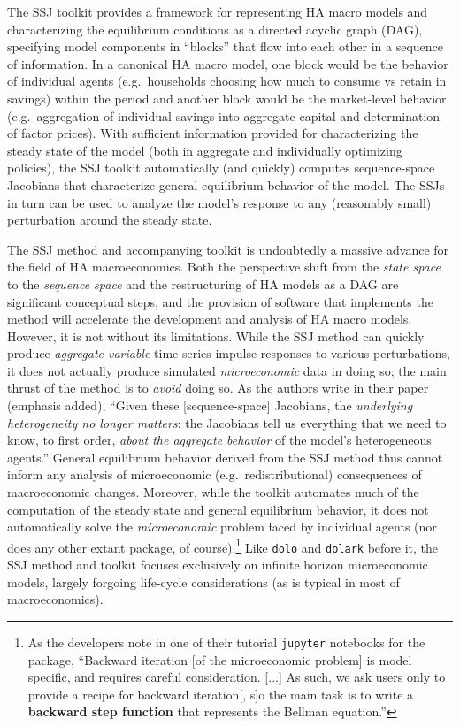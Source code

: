 \documentclass[12pt,pdftex,letterpaper]{article}
\begin{document}
The SSJ toolkit provides a framework for representing HA macro models and characterizing the equilibrium conditions as a directed acyclic graph (DAG), specifying model components in ``blocks'' that flow into each other in a sequence of information. In a canonical HA macro model, one block would be the behavior of individual agents (e.g.\ households choosing how much to consume vs retain in savings) within the period and another block would be the market-level behavior (e.g.\ aggregation of individual savings into aggregate capital and determination of factor prices). With sufficient information provided for characterizing the steady state of the model (both in aggregate and individually optimizing policies), the SSJ toolkit automatically (and quickly) computes sequence-space Jacobians that characterize general equilibrium behavior of the model. The SSJs in turn can be used to analyze the model's response to any (reasonably small) perturbation around the steady state.

The SSJ method and accompanying toolkit is undoubtedly a massive advance for the field of HA macroeconomics. Both the perspective shift from the \textit{state space} to the \textit{sequence space} and the restructuring of HA models as a DAG are significant conceptual steps, and the provision of software that implements the method will accelerate the development and analysis of HA macro models. However, it is not without its limitations. While the SSJ method can quickly produce \textit{aggregate variable} time series impulse responses to various perturbations, it does not actually produce simulated \textit{microeconomic} data in doing so; the main thrust of the method is to \textit{avoid} doing so. As the authors write in their paper (emphasis added), ``Given these [sequence-space] Jacobians, the \textit{underlying heterogeneity no longer matters}: the Jacobians tell us everything that we need to know, to first order, \textit{about the aggregate behavior} of the model’s heterogeneous agents.'' General equilibrium behavior derived from the SSJ method thus cannot inform any analysis of microeconomic (e.g.\ redistributional) consequences of macroeconomic changes. Moreover, while the toolkit automates much of the computation of the steady state and general equilibrium behavior, it does not automatically solve the \textit{microeconomic} problem faced by individual agents (nor does any other extant package, of course).\footnote{As the developers note in one of their tutorial \texttt{jupyter} notebooks for the package, ``Backward iteration [of the microeconomic problem] is model specific, and requires careful consideration. [...] As such, we ask users only to provide a recipe for backward iteration[, s]o the main task is to write a \textbf{backward step function} that represents the Bellman equation.''} Like \texttt{dolo} and \texttt{dolark} before it, the SSJ method and toolkit focuses exclusively on infinite horizon microeconomic models, largely forgoing life-cycle considerations (as is typical in most of macroeconomics).
\end{document}
